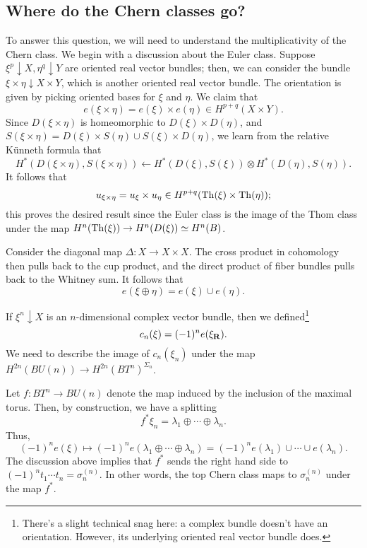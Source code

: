 \subsection{Where do the Chern classes go?}\label{euler-multiplicativity}
To answer this question, we will need to understand the multiplicativity of the
Chern class. We begin with a discussion about the Euler class. Suppose $\xi^p\downarrow X,\eta^q\downarrow Y$ are oriented real
vector bundles; then, we can consider the bundle $\xi\times\eta\downarrow X\times Y$, which is
another oriented real vector bundle. The orientation is given by picking
oriented bases for $\xi$ and $\eta$.
We claim that
$$e(\xi\times\eta) = e(\xi)\times e(\eta) \in H^{p+q}(X\times Y).$$
Since $D(\xi\times\eta)$ is homeomorphic to $D(\xi)\times D(\eta)$, and
$S(\xi\times\eta) = D(\xi)\times S(\eta)\cup S(\xi)\times D(\eta)$, we learn
from the relative K\"unneth formula that
$$H^\ast(D(\xi\times\eta),S(\xi\times\eta)) \leftarrow
H^\ast(D(\xi),S(\xi))\otimes H^\ast(D(\eta),S(\eta)).$$
It follows that
$$
u_{\xi\times \eta} = u_\xi\times u_\eta\in H^{p+q}(\operatorname{Th}(\xi)\times\operatorname{Th}(\eta));
$$
this proves the desired result since the Euler class is the image of the Thom
class under the map $H^n(\operatorname{Th}(\xi))\to H^n(D(\xi)) \simeq H^n(B)$.

Consider the diagonal map $\Delta:X\to X\times X$. The cross product in
cohomology then pulls back to the cup product, and the direct product of fiber
bundles pulls back to the Whitney sum. It follows that
$$e(\xi\oplus\eta) = e(\xi)\cup e(\eta).$$

If $\xi^n\downarrow X$ is an $n$-dimensional complex vector bundle, then we
defined\footnote{There's a slight technical snag here: a complex bundle doesn't
have an orientation. However, its underlying oriented real vector bundle does.}
$$
c_n(\xi) = (-1)^n e(\xi_\mathbf R).
$$
We need to describe the image of $c_n(\xi_n)$ under the map $H^{2n}(BU(n)) \to
H^{2n}(BT^n)^{\Sigma_n}$.

Let $f:BT^n\to BU(n)$ denote the map induced by the inclusion of the maximal
torus. Then, by construction, we have a splitting
$$f^\ast\xi_n = \lambda_1\oplus\cdots\oplus \lambda_n.$$
Thus,
$$(-1)^ne(\xi)\mapsto (-1)^n e(\lambda_1\oplus\cdots\oplus \lambda_n) = (-1)^n
e(\lambda_1)\cup\cdots\cup e(\lambda_n).$$
The discussion above implies that $f^\ast$ sends the right hand side to
$(-1)^nt_1\cdots t_n = \sigma_n^{(n)}$. In other words, the top Chern class
maps to $\sigma_n^{(n)}$ under the map $f^\ast$.

